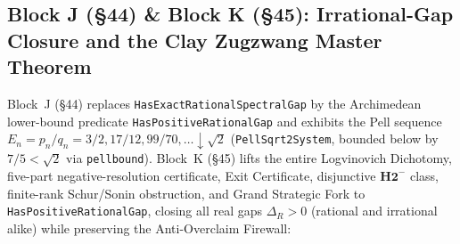 \documentclass[11pt,a4paper]{article}
\def\R{R}\def\N{N}\def\Q{Q}\def\Z{Z}\def\Class{C}\def\OS{OS}\def\Gap{Gap}%
\theoremstyle{plain}
\theoremstyle{definition}
\theoremstyle{remark}
\newcommand{\R}{\mathbb{R}}\newcommand{\N}{\mathbb{N}}\newcommand{\Q}{\mathbb{Q}}
\newcommand{\Z}{\mathbb{Z}}\newcommand{\Spec}{\operatorname{Spec}}
\newcommand{\OS}{\mathrm{OS}}\newcommand{\Gap}{\mathrm{Gap}}
\newcommand{\Class}{\mathcal{C}}\newcommand{\Htot}{\mathcal{H}}
\renewcommand{\_}{\oldunderscore\allowbreak}
\newcommand{\Lean}[1]{\texttt{\small #1}}
\begin{document}
\subsection{Block J (\S44) \& Block K (\S45): Irrational-Gap Closure and the Clay Zugzwang Master Theorem}
Block~J (\S44) replaces \Lean{HasExactRationalSpectralGap} by the Archimedean lower-bound predicate
\Lean{HasPositiveRationalGap} and exhibits the Pell sequence $E_n = p_n/q_n = 3/2, 17/12, 99/70,\dots \downarrow \sqrt{2}$
(\Lean{PellSqrt2System}, bounded below by $7/5 < \sqrt{2}$ via \Lean{pell\_7\_5\_bound}).
Block~K (\S45) lifts the entire Logvinovich Dichotomy, five-part negative-resolution certificate,
Exit Certificate, disjunctive $\textbf{H2}^-$ class, finite-rank Schur/Sonin obstruction, and
Grand Strategic Fork to \Lean{HasPositiveRationalGap}, closing all real gaps $\Delta_\R>0$
(rational and irrational alike) while preserving the Anti-Overclaim Firewall:
\end{document}
